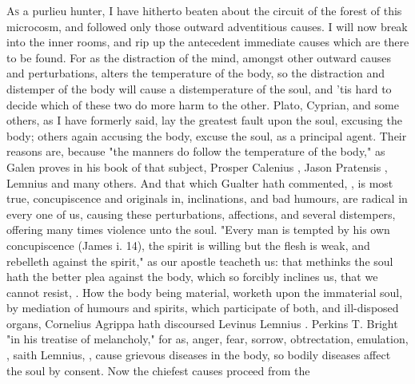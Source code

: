 \lettrine{A}{s} a purlieu hunter, I have hitherto beaten about the circuit of
the forest of this microcosm, and followed only those outward adventitious
causes. I will now break into the inner rooms, and rip up the antecedent
immediate causes which are there to be found. For as the distraction of the
mind, amongst other outward causes and perturbations, alters the temperature of
the body, so the distraction and distemper of the body will cause a
distemperature of the soul, and 'tis hard to decide which of these two do more
harm to the other. Plato, Cyprian, and some others, as I have formerly said,
lay the greatest fault upon the soul, excusing the body; others again accusing
the body, excuse the soul, as a principal agent. Their reasons are, because
"the manners do follow the temperature of the body," as
Galen proves in his book of that subject, Prosper Calenius
, Jason Pratensis , Lemnius  and many others. And that
which Gualter hath commented, , is most true, concupiscence and originals in, inclinations, and bad
humours, are radical in every one of us, causing these
perturbations, affections, and several distempers, offering many times violence
unto the soul. "Every man is tempted by his own concupiscence (James i. 14),
the spirit is willing but the flesh is weak, and rebelleth against the spirit,"
as our apostle teacheth us: that methinks the soul hath
the better plea against the body, which so forcibly inclines us, that we cannot
resist, . How the body
being material, worketh upon the immaterial soul, by mediation of humours and
spirits, which participate of both, and ill-disposed organs, Cornelius Agrippa
hath discoursed  Levinus Lemnius . Perkins  T. Bright  "in
his treatise of melancholy," for as, anger, fear, sorrow,
obtrectation, emulation, \etc{} ,
saith Lemnius, , cause grievous diseases in the body, so bodily
diseases affect the soul by consent. Now the chiefest causes proceed from the

